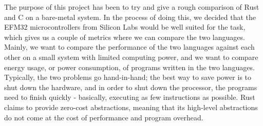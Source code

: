The purpose of this project has been to try and give a rough comparison of Rust and C on a bare-metal system.
In the process of doing this, we decided that the EFM32 microcontrollers from Silicon Labs would be well suited for the task, which gives us a couple of metrics where we can compare the two languages.
Mainly, we want to compare the performance of the two languages against each other on a small system with limited computing power, and we want to compare energy usage, or power consumption, of programs written in the two languages.
Typically, the two problems go hand-in-hand; the best way to save power is to shut down the hardware, and in order to shut down the processor, the programs need to finish quickly - basically, executing as few instructions as possible.
Rust claims to provide zero-cost abstractions, meaning that its high-level abstractions do not come at the cost of performance and program overhead.

